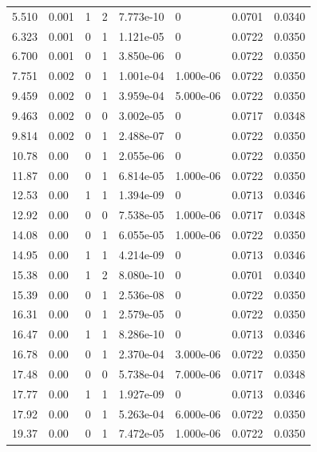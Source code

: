 \documentclass[preview]{standalone}
\begin{document}
{{\begin{tabular}{L{1.2cm}C{1.2cm} C{0.3cm}C{0.5cm} C{1.4cm}C{1.4cm} C{1.4cm}C{1.4cm}}
  5.510  &  0.001  & 1     &  2 &  7.773e-10  & 0  & 0.0701 &  0.0340   \\ 
  6.323  &  0.001  & 0     &  1 &  1.121e-05  & 0  & 0.0722 &  0.0350   \\ 
  6.700  &  0.001  & 0     &  1 &  3.850e-06  & 0  & 0.0722 &  0.0350   \\ 
  7.751  &  0.002  & 0     &  1 &  1.001e-04  & 1.000e-06  & 0.0722 &  0.0350   \\ 
  9.459  &  0.002  & 0     &  1 &  3.959e-04  & 5.000e-06  & 0.0722 &  0.0350   \\ 
  9.463  &  0.002  & 0     &  0 &  3.002e-05  & 0  & 0.0717 &  0.0348   \\ 
  9.814  &  0.002  & 0     &  1 &  2.488e-07  & 0  & 0.0722 &  0.0350   \\ 
  10.78  &  0.00  & 0     &  1 &  2.055e-06  & 0  & 0.0722 &  0.0350   \\ 
  11.87  &  0.00  & 0     &  1 &  6.814e-05  & 1.000e-06  & 0.0722 &  0.0350   \\ 
  12.53  &  0.00  & 1     &  1 &  1.394e-09  & 0  & 0.0713 &  0.0346   \\ 
  12.92  &  0.00  & 0     &  0 &  7.538e-05  & 1.000e-06  & 0.0717 &  0.0348   \\ 
  14.08  &  0.00  & 0     &  1 &  6.055e-05  & 1.000e-06  & 0.0722 &  0.0350   \\ 
  14.95  &  0.00  & 1     &  1 &  4.214e-09  & 0  & 0.0713 &  0.0346   \\ 
  15.38  &  0.00  & 1     &  2 &  8.080e-10  & 0  & 0.0701 &  0.0340   \\ 
  15.39  &  0.00  & 0     &  1 &  2.536e-08  & 0  & 0.0722 &  0.0350   \\ 
  16.31  &  0.00  & 0     &  1 &  2.579e-05  & 0  & 0.0722 &  0.0350   \\ 
  16.47  &  0.00  & 1     &  1 &  8.286e-10  & 0  & 0.0713 &  0.0346   \\ 
  16.78  &  0.00  & 0     &  1 &  2.370e-04  & 3.000e-06  & 0.0722 &  0.0350   \\ 
  17.48  &  0.00  & 0     &  0 &  5.738e-04  & 7.000e-06  & 0.0717 &  0.0348   \\ 
  17.77  &  0.00  & 1     &  1 &  1.927e-09  & 0  & 0.0713 &  0.0346   \\ 
  17.92  &  0.00  & 0     &  1 &  5.263e-04  & 6.000e-06  & 0.0722 &  0.0350   \\ 
  19.37  &  0.00  & 0     &  1 &  7.472e-05  & 1.000e-06  & 0.0722 &  0.0350   \\ 

\end{tabular}}}
\end{document}
